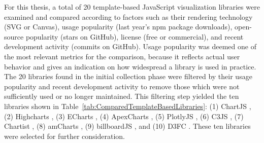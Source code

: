For this thesis, a total of 20 template-based JavaScript visualization
libraries were examined and compared according to factors such as
their rendering technology (SVG or Canvas), usage popularity (last
year's npm package downloads), open-source popularity (stars on
GitHub), license (free or commercial), and recent development activity
(commits on GitHub). Usage popularity was deemed one of the most
relevant metrics for the comparison, because it reflects actual user
behavior and gives an indication on how widespread a library is used
in practice. The 20 libraries found in the initial collection phase
were filtered by their usage popularity and recent development
activity to remove those which were not sufficiently used or no longer
maintained. This filtering step yielded the ten libraries shown in
Table~\ref{tab:ComparedTemplateBasedLibraries}: (1) ChartJS
\parencite{ChartJS}, (2) Highcharts \parencite{Highcharts}, (3)
ECharts \parencite{ECharts}, (4) ApexCharts \parencite{ApexCharts},
(5) PlotlyJS \parencite{PlotlyJS}, (6) C3JS \parencite{C3JS}, (7)
Chartist \parencite{Chartist}, (8) amCharts \parencite{amCharts}, (9)
billboardJS \parencite{billboardJS}, and (10) D3FC \parencite{D3FC}.
These ten libraries were selected for further consideration.



